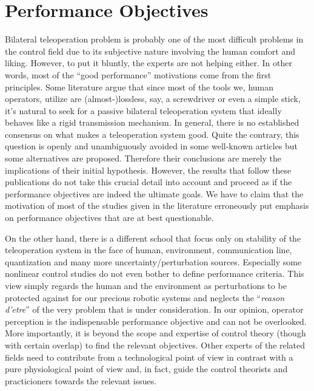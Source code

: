 \chapter{Performance Objectives}
\label{chap:perf}


Bilateral teleoperation problem is probably one of the most difficult problems in the control field due to its 
subjective nature involving the human comfort and liking. However, to put it bluntly, the experts are not helping 
either. In other words, most of the \enquote{good performance} motivations come from the first principles. Some 
literature argue that since most of the tools we, human operators, utilize are (almost-)lossless, say, a 
screwdriver or even a simple stick, it's natural to seek for a passive bilateral teleoperation system that 
ideally behaves like a rigid transmission mechanism. In general, there is no established consensus on what makes 
a teleoperation system good. Quite the contrary, this question is openly and unambiguously avoided in some 
well-known articles but some alternatives are proposed. Therefore their conclusions are merely the implications of 
their initial hypothesis. However, the results that follow these publications do not take this crucial detail into account
and proceed as if the performance objectives are indeed the ultimate goals. We have to claim that the motivation 
of most of the studies given in the literature erroneously put emphasis on performance objectives that are at 
best questionable. 

On the other hand, there is a different school that focus only on stability of the teleoperation system in the 
face of human, environment, communication line, quantization and many more uncertainty/perturbation sources. 
Especially some nonlinear control studies do not even bother to define performance criteria. This view simply 
regards the human and the environment as perturbations to be protected against for our precious robotic systems 
and neglects the \enquote{\emph{reason d'etre}} of the very problem that is under consideration. In our opinion, 
operator perception is the indispensable performance objective and can not be overlooked. More importantly, it is
beyond the scope and expertise of control theory (though with certain overlap) to find the relevant 
objectives. Other experts of the related fields need to contribute from a technological point of view in 
contrast with a pure physiological point of view and, in fact, guide the control theorists and practicioners towards 
the relevant issues. 

